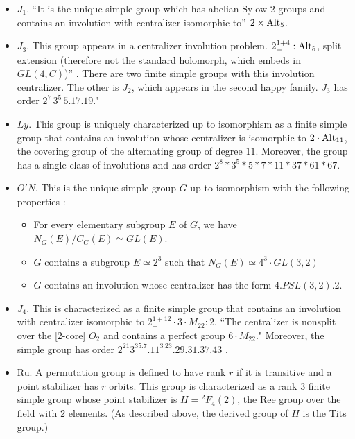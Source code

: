 \begin{itemize}
\item $J_1$.  ``It is the unique simple group which has abelian Sylow
  $2$-groups and contains an involution with centralizer isomorphic to''
  $2 \times \text{Alt}_5$.   \cite[p.150]{robert1998twelve}
\item $J_3$. This group appears in a centralizer involution problem.
  $2^{1+4}_{-}:\text{Alt}_5$, split extension (therefore not the standard
  holomorph, which embeds in $GL(4,C)$)''
  \cite[p.151]{robert1998twelve}.  There are two finite simple groups
  with this involution centralizer.  The other is $J_2$, which appears
  in the second happy family.  $J_3$ has order $2^7\,3^5\,5.17.19$."
\item $Ly$.  This group is uniquely characterized up to isomorphism as
  a finite simple group that contains an involution whose centralizer
  is isomorphic to $2 \cdot \text{Alt}_{11}$, the covering group of the
  alternating group of degree $11$.  Moreover, the group has a single
  class of involutions and has order
  $2^8*3^5*5*7*11*37*61*67$. \cite[p.151]{robert1998twelve}
\item $O'N$. This is the unique simple group $G$ up to isomorphism
  with the following properties \cite[p.152]{robert1998twelve}:
\begin{itemize}
\item For every elementary subgroup $E$ of $G$, we have
 $N_G(E)/C_G(E) \simeq GL(E)$.
 \item $G$ contains a subgroup $E \simeq 2^3$
 such that $N_G(E) \simeq 4^3 \cdot 
 GL(3,2)$
 \item $G$ contains an involution whose centralizer has the form
 $4.PSL(3,2).2$.
\end{itemize}
\item $J_4$. This is characterized as a finite simple group that
  contains an involution with centralizer isomorphic to
  $2^{1+12}_{-}\cdot 3\cdot M_{22}:2$.  ``The centralizer is nonsplit
  over the [$2$-core] $O_2$ and contains a perfect group $6\cdot
  M_{22}$."  Moreover, the simple group has order
  $2^{21}3^35.7.11^3.23.29.31.37.43$ \cite[p.152]{robert1998twelve}.
\item Ru.  A permutation group is defined to have rank $r$ if it is
  transitive and a point stabilizer has $r$ orbits.  This group is
  characterized as a rank $3$ finite simple group whose point
  stabilizer is $H = {}^2F_4(2)$, the Ree group over the field with
  $2$ elements. (As described above, the derived group of $H$ is the
  Tits group.) \cite[p.151]{robert1998twelve}
\end{itemize}
 

